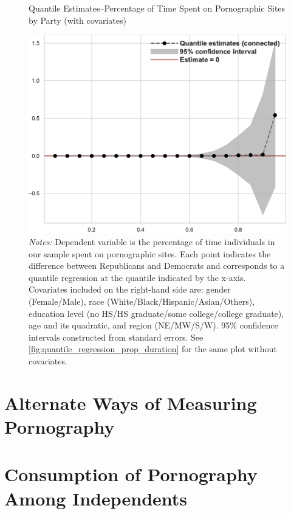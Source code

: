 \documentclass[12pt, letterpaper]{article}
\begin{document}
\begin{figure}[ht]
	\centering
	\caption{Quantile Estimates--Percentage of Time Spent on Pornographic Sites by Party (with covariates)}
	\includegraphics[width=.55\linewidth]{../figs/quantile_reg_covariates_proportion_duration_adult.pdf}
	\caption*{\footnotesize \emph{Notes:} 
		Dependent variable is the percentage of time individuals in our sample spent on pornographic sites.
		Each point indicates the difference between Republicans and Democrats and corresponds to a quantile regression at the quantile indicated by the x-axis.
		Covariates included on the right-hand side are: gender (Female/Male), race (White/Black/Hispanic/Asian/Others), education level (no HS/HS graduate/some college/college graduate), age and its quadratic, and region (NE/MW/S/W).
		95\% confidence intervals constructed from standard errors.
		See \cref{fig:quantile_regression_prop_duration} for the same plot without covariates.
	}
	\label{fig:quantile_regression_prop_duration_covariates}
\end{figure}
\clearpage

\FloatBarrier
\section{Alternate Ways of Measuring Pornography}
\label{si:alternate_ways}
\clearpage

\section{Consumption of Pornography Among Independents}
\end{document}
